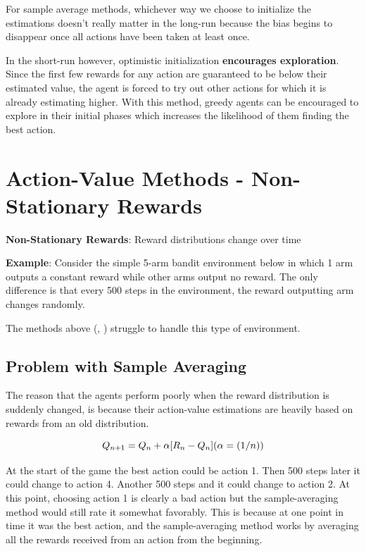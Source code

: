 \vspace{0.2cm}

For sample average methods, whichever way we choose to initialize the estimations doesn’t really matter in the long-run because the bias begins to disappear once all actions have been taken at least once.

In the short-run however, optimistic initialization \textbf{encourages exploration}. Since the first few rewards for any action are guaranteed to be below their estimated value, the agent is forced to try out other actions for which it is already estimating higher. With this method, greedy agents can be encouraged to explore in their initial phases which increases the likelihood of them finding the best action.

\section{Action-Value Methods - Non-Stationary Rewards \cite{medium-numsmt2-rl-ch2-part-3}}\label{Action-Value Methods - Non-Stationary Rewards}

\textbf{Non-Stationary Rewards}\label{Non-Stationary Rewards}: Reward distributions change over time

\textbf{Example}: Consider the simple 5-arm bandit environment below in which 1 arm outputs a constant reward while other arms output no reward. The only difference is that every 500 steps in the environment, the reward outputting arm changes randomly.

The methods above (, ) struggle to handle this type of environment.

\subsection{Problem with Sample Averaging}
The reason that the agents perform poorly when the reward distribution is suddenly changed, is because their action-value estimations are heavily based on rewards from an old distribution.

\[
    Q_{n+1} = Q_n + \alpha [R_n - Q_n] \hfill (\alpha = (1/n))
\]

At the start of the game the best action could be action 1. Then 500 steps later it could change to action 4. Another 500 steps and it could change to action 2. At this point, choosing action 1 is clearly a bad action but the sample-averaging method would still rate it somewhat favorably. This is because at one point in time it was the best action, and the sample-averaging method works by averaging all the rewards received from an action from the beginning.

